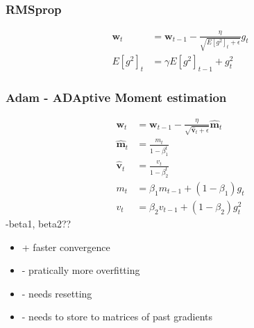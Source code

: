 \subsubsection{RMSprop}
\label{sssect:rmsprop}
\begin{align*}
\mathbf{w}_t &= \mathbf{w}_{t - 1} - \frac{\eta}{\sqrt{E[g^2]_t + \epsilon}} g_t \\
E[g^2]_t &= \gamma E[g^2]_{t - 1} + g_t^2
\end{align*}
\subsubsection{Adam - ADAptive Moment estimation}
\label{sssect:adam}
\begin{align*}
\mathbf{w}_t &= \mathbf{w}_{t - 1} - \frac{\eta}{\sqrt{\widehat{\mathbf{v}}_t + \epsilon}} \widehat{\mathbf{m}}_t \\
\widehat{\mathbf{m}}_t &= \frac{m_t}{1-\beta_1^t}\\
\widehat{\mathbf{v}}_t &= \frac{v_t}{1-\beta_2^t}\\
m_t &= \beta_1 m_{t - 1} + (1 - \beta_1)g_t \\
v_t &= \beta_2 v_{t - 1} + (1 - \beta_2) g_t^2
\end{align*}
-beta1, beta2??
\begin{itemize}
	\item + faster convergence
	\item - pratically more overfitting
	\item - needs resetting
	\item - needs to store to matrices of past gradients
\end{itemize}
\newpage